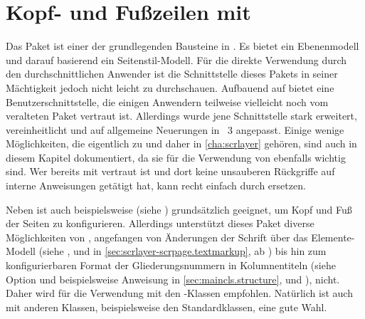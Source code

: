 \chapter[{Kopf- und Fußzeilen mit \Package{scrlayer-scrpage}}]
  {Kopf- und Fußzeilen mit
    }
%
\BeginIndexGroup%
%
Das Paket \hyperref[cha:scrlayer]{}%
%
 ist einer der grundlegenden Bausteine in
\KOMAScript{}. Es bietet ein Ebenenmodell und darauf basierend ein
Seitenstil-Modell. Für die direkte Verwendung durch den durchschnittlichen
Anwender ist die Schnittstelle dieses Pakets in seiner Mächtigkeit jedoch
nicht leicht zu durchschauen.  Aufbauend auf
\hyperref[cha:scrlayer]{} bietet
 eine
Benutzerschnittstelle, die einigen Anwendern teilweise vielleicht noch vom
veralteten Paket
vertraut ist. Allerdings wurde jene Schnittstelle stark erweitert,
vereinheitlicht und auf allgemeine Neuerungen in \KOMAScript~3 angepasst.
Einige wenige Möglichkeiten, die eigentlich zu
\hyperref[cha:scrlayer]{} und daher in
\autoref{cha:scrlayer} gehören, sind auch in diesem Kapitel dokumentiert, da
sie für die Verwendung von  ebenfalls wichtig
sind. Wer bereits mit  vertraut ist und dort keine
unsauberen Rückgriffe auf interne Anweisungen getätigt hat, kann %
\iffalse in der Regel \fi%
 recht einfach durch  ersetzen.

Neben  ist auch beispielsweise
%
 (siehe \cite{package:fancyhdr})
grundsätzlich geeignet, um Kopf und Fuß der Seiten zu
konfigurieren. Allerdings unterstützt dieses Paket diverse
Möglichkeiten von \KOMAScript{}, angefangen von Änderungen der Schrift über
das Elemente-Modell (siehe ,
 und
 in
\autoref{sec:scrlayer-scrpage.textmarkup}, ab
) bis hin zum konfigurierbaren Format
der Gliederungsnummern in Kolumnentiteln (siehe Option
 und beispielsweise Anweisung
 in \autoref{sec:maincls.structure},
 und
),
nicht. Daher wird für die Verwendung mit den
\KOMAScript-Klassen  empfohlen. Natürlich ist
 auch mit anderen Klassen, beispielsweise den
Standardklassen, eine gute Wahl.

